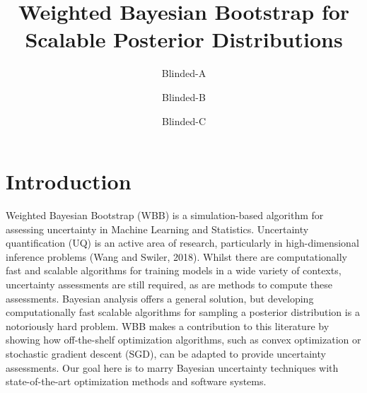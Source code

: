 \documentclass[12pt]{TD-CJS}
\begin{document}


\title[Weighted Bayesian Bootstrap]{Weighted Bayesian Bootstrap for Scalable Posterior Distributions 
 }
\author{Blinded-A}
\author{Blinded-B}
\author{Blinded-C}


\makechaptertitle


\newpage

\section{Introduction}
Weighted Bayesian Bootstrap (WBB) is a simulation-based algorithm for assessing uncertainty in Machine Learning and Statistics. Uncertainty quantification (UQ) is an active area of research, particularly in high-dimensional inference problems (Wang and Swiler, 2018). 
Whilst there are computationally fast and scalable algorithms for training models in a wide variety of contexts, uncertainty assessments are still required, as are methods to compute these assessments.  Bayesian analysis offers a general solution, but developing computationally fast scalable algorithms for sampling a posterior distribution is a notoriously hard problem. WBB makes a contribution to this literature by showing how off-the-shelf optimization algorithms, such as convex optimization or stochastic gradient descent (SGD), can be adapted to provide uncertainty assessments. Our goal here is to marry Bayesian uncertainty techniques with state-of-the-art optimization methods 
and software systems.
 
\end{document}
